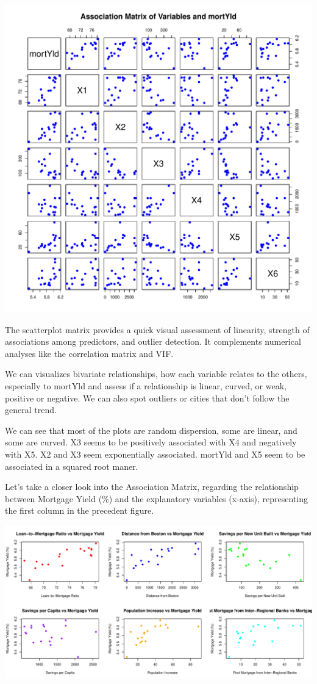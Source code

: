 \documentclass[
  11pt,
]{article}
\begin{document}
\includegraphics{Figs/unnamed-chunk-5-1.pdf}

The scatterplot matrix provides a quick visual assessment of linearity,
strength of associations among predictors, and outlier detection. It
complements numerical analyses like the correlation matrix and VIF.

We can visualizes bivariate relationships, how each variable relates to
the others, especially to mortYld and assess if a relationship is
linear, curved, or weak, positive or negative. We can also spot outliers
or cities that don't follow the general trend.

We can see that most of the plots are random dispersion, some are
linear, and some are curved. X3 seems to be positively associated with
X4 and negatively with X5. X2 and X3 seem exponentially associated.
mortYld and X5 seem to be associated in a squared root maner.

Let's take a closer look into the Association Matrix, regarding the
relationship between Mortgage Yield (\%) and the explanatory variables
(x-axis), representing the first column in the precedent figure.

\includegraphics{Figs/unnamed-chunk-6-1.pdf}
\end{document}
